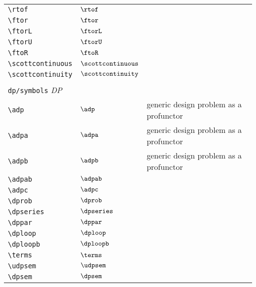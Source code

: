 \begin{longtable}{lll}
 \hline
{\color[rgb]{0.5,0.5,0.5}\texttt{\textbackslash rtof}} & $\rtof$ & \\ 
 {\color[rgb]{0.5,0.5,0.5}\texttt{\textbackslash ftor}} & $\ftor$ & \\ 
 {\color[rgb]{0.5,0.5,0.5}\texttt{\textbackslash ftorL}} & $\ftorL$ & \\ 
 {\color[rgb]{0.5,0.5,0.5}\texttt{\textbackslash ftorU}} & $\ftorU$ & \\ 
 {\color[rgb]{0.5,0.5,0.5}\texttt{\textbackslash ftoR}} & $\ftoR$ & \\ 
 {\color[rgb]{0.5,0.5,0.5}\texttt{\textbackslash scottcontinuous}} & $\scottcontinuous$ & \\ 
 {\color[rgb]{0.5,0.5,0.5}\texttt{\textbackslash scottcontinuity}} & $\scottcontinuity$ & \\ 
  &  & \\ 
 \multicolumn{3}{l}{{\color[rgb]{0.5,0.5,0.5}\texttt{dp/symbols}} \emph{DP}}\\ 
 \hline
{\color[rgb]{0.5,0.5,0.5}\texttt{\textbackslash adp}} & $\adp$ &  generic design problem as a profunctor\\ 
 {\color[rgb]{0.5,0.5,0.5}\texttt{\textbackslash adpa}} & $\adpa$ &  generic design problem as a profunctor\\ 
 {\color[rgb]{0.5,0.5,0.5}\texttt{\textbackslash adpb}} & $\adpb$ &  generic design problem as a profunctor\\ 
 {\color[rgb]{0.5,0.5,0.5}\texttt{\textbackslash adpab}} & $\adpab$ & \\ 
 {\color[rgb]{0.5,0.5,0.5}\texttt{\textbackslash adpc}} & $\adpc$ & \\ 
 {\color[rgb]{0.5,0.5,0.5}\texttt{\textbackslash dprob}} & $\dprob$ & \\ 
 {\color[rgb]{0.5,0.5,0.5}\texttt{\textbackslash dpseries}} & $\dpseries$ & \\ 
 {\color[rgb]{0.5,0.5,0.5}\texttt{\textbackslash dppar}} & $\dppar$ & \\ 
 {\color[rgb]{0.5,0.5,0.5}\texttt{\textbackslash dploop}} & $\dploop$ & \\ 
 {\color[rgb]{0.5,0.5,0.5}\texttt{\textbackslash dploopb}} & $\dploopb$ & \\ 
 {\color[rgb]{0.5,0.5,0.5}\texttt{\textbackslash terms}} & $\terms$ & \\ 
 {\color[rgb]{0.5,0.5,0.5}\texttt{\textbackslash udpsem}} & $\udpsem$ & \\ 
 {\color[rgb]{0.5,0.5,0.5}\texttt{\textbackslash dpsem}} & $\dpsem$ & \\ 

\end{longtable}
